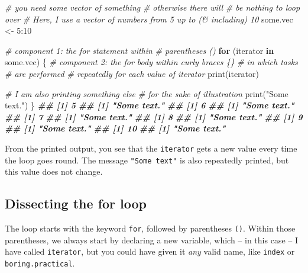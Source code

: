 \documentclass[
]{book}
\newenvironment{Shaded}{\begin{snugshade}}{\end{snugshade}}
\newcommand{\CommentTok}[1]{\textcolor[rgb]{0.56,0.35,0.01}{\textit{#1}}}
\newcommand{\ControlFlowTok}[1]{\textcolor[rgb]{0.13,0.29,0.53}{\textbf{#1}}}
\newcommand{\DecValTok}[1]{\textcolor[rgb]{0.00,0.00,0.81}{#1}}
\newcommand{\DocumentationTok}[1]{\textcolor[rgb]{0.56,0.35,0.01}{\textbf{\textit{#1}}}}
\newcommand{\FunctionTok}[1]{\textcolor[rgb]{0.00,0.00,0.00}{#1}}
\newcommand{\NormalTok}[1]{#1}
\newcommand{\OtherTok}[1]{\textcolor[rgb]{0.56,0.35,0.01}{#1}}
\newcommand{\SpecialCharTok}[1]{\textcolor[rgb]{0.00,0.00,0.00}{#1}}
\newcommand{\StringTok}[1]{\textcolor[rgb]{0.31,0.60,0.02}{#1}}
\begin{document}
\begin{Shaded}
\begin{Highlighting}[]
\CommentTok{\# you need some vector of something}
\CommentTok{\# otherwise there will}
\CommentTok{\# be nothing to loop over}
\CommentTok{\# Here, I use a vector of numbers from 5 up to (\& including) 10}
\NormalTok{some.vec }\OtherTok{\textless{}{-}} \DecValTok{5}\SpecialCharTok{:}\DecValTok{10}

\CommentTok{\# component 1: the for statement within }
\CommentTok{\# parentheses ()}
\ControlFlowTok{for}\NormalTok{ (iterator }\ControlFlowTok{in}\NormalTok{ some.vec) }
\NormalTok{\{}
    \CommentTok{\# component 2: the for body within curly braces \{\} }
    \CommentTok{\# in which tasks }
    \CommentTok{\# are performed}
    \CommentTok{\# repeatedly for each value of iterator}
    \FunctionTok{print}\NormalTok{(iterator)}
    
    \CommentTok{\# I am also printing something else}
    \CommentTok{\# for the sake of illustration}
    \FunctionTok{print}\NormalTok{(}\StringTok{"Some text."}\NormalTok{)}
\NormalTok{\}}
\DocumentationTok{\#\# [1] 5}
\DocumentationTok{\#\# [1] "Some text."}
\DocumentationTok{\#\# [1] 6}
\DocumentationTok{\#\# [1] "Some text."}
\DocumentationTok{\#\# [1] 7}
\DocumentationTok{\#\# [1] "Some text."}
\DocumentationTok{\#\# [1] 8}
\DocumentationTok{\#\# [1] "Some text."}
\DocumentationTok{\#\# [1] 9}
\DocumentationTok{\#\# [1] "Some text."}
\DocumentationTok{\#\# [1] 10}
\DocumentationTok{\#\# [1] "Some text."}
\end{Highlighting}
\end{Shaded}

From the printed output, you see that the \texttt{iterator} gets a new value every time the loop goes round. The message \texttt{"Some\ text"} is also repeatedly printed, but this value does not change.

\hypertarget{dissecting-the-for-loop}{%
\subsection{Dissecting the for loop}\label{dissecting-the-for-loop}}

The loop starts with the keyword \texttt{for}, followed by parentheses \texttt{()}. Within those parentheses, we always start by declaring a new variable, which -- in this case -- I have called \texttt{iterator}, but you could have given it \emph{any} valid name, like \texttt{index} or \texttt{boring.practical}.
\end{document}
